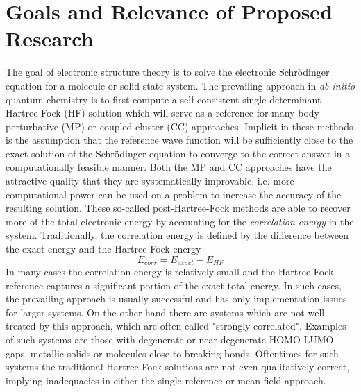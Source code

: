 \documentclass{revtex4}
\begin{document}
\section{Goals and Relevance of Proposed Research}
    The goal of electronic structure theory is to solve the electronic Schr{\"o}dinger equation
    for a molecule or solid state system. The prevailing approach in \emph{ab initio} quantum 
    chemistry is to first compute a self-consistent single-determinant Hartree-Fock (HF) solution 
    which will serve as a reference for many-body perturbative (MP) or coupled-cluster (CC) 
    approaches.  
    Implicit in these methods is the assumption that the reference wave function will be 
    sufficiently close to the exact solution of the Schr{\"o}dinger equation to converge to the 
    correct 
    answer in a computationally feasible manner. Both the MP and CC approaches have the attractive 
    quality that they are systematically improvable, i.e. more computational power can be used on a 
    problem to increase the accuracy of the resulting solution. These so-called post-Hartree-Fock 
    methods are able to recover more of the total electronic energy by accounting for the 
    \emph{correlation energy} in the system. Traditionally, the correlation energy is defined by 
    the difference between the exact energy and the Hartree-Fock energy \cite{Shavitt2009}
    \begin{equation}\label{correlation_energy}
      E_{corr} = E_{exact} -  E_{HF}
    \end{equation}
    In many cases the correlation energy is relatively small and the Hartree-Fock reference 
    captures a significant portion of the exact total energy. In such cases, the prevailing 
    approach is usually successful and has only implementation issues for larger systems. On the 
    other hand there are systems which are not well treated by this approach, which are often 
    called "strongly correlated". Examples of such systems are those with degenerate or 
    near-degenerate HOMO-LUMO gaps, metallic solids or molecules close to breaking bonds. 
    Oftentimes for such systems the traditional Hartree-Fock solutions are not even qualitatively 
    correct, implying inadequacies in either the single-reference or mean-field approach. 
      
\end{document}
